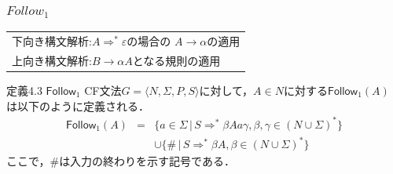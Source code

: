 \documentclass[dvipdfmx]{beamer}
\begin{document}
\begin{frame}
  \frametitle{$Follow_1$}


  \begin{tabular}{l}
    下向き構文解析:$A\Rightarrow^\ast\varepsilon$の場合の
    $A\rightarrow\alpha$の適用 \\
    上向き構文解析:$B\rightarrow\alpha A$となる規則の適用
  \end{tabular}

  {\small
  \begin{itembox}[l]{定義4.3 $\mathsf{Follow}_1$}
    CF文法$G=\langle N,\Sigma,P,S\rangle$に対して，$A\in N$に対する$\mathsf{Follow}_1(A)$
    は以下のように定義される．
    \[\begin{array}{rcl}
        \mathsf{Follow}_1(A) & = & \{a\in\Sigma\,|\,S\Rightarrow^\ast\beta Aa\gamma,\beta,\gamma\in(N\cup\Sigma)^\ast\} \\
                             &   & \cup\{\#\,|\,S\Rightarrow^\ast\beta A, \beta\in(N\cup\Sigma)^\ast\}
      \end{array}
    \]
    ここで，$\#$は入力の終わりを示す記号である．


  \end{itembox}}
\end{frame}
\end{document}
